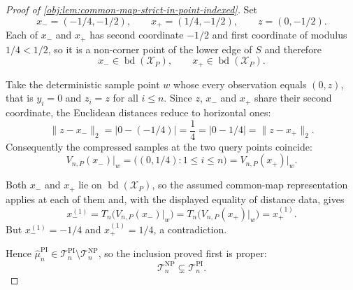 \begin{proof}[Proof of \cref{obj:lem:common-map-strict-in-point-indexed}]
Set
\[
x_-=(-1/4,-1/2),\qquad x_+=(1/4,-1/2),\qquad z=(0,-1/2).
\]
Each of \(x_-\) and \(x_+\) has second coordinate \(-1/2\) and first coordinate of modulus \(1/4<1/2\), so it is a non-corner point of the lower edge of \(S\) and therefore
\[
x_-\in\operatorname{bd}(\mathcal X_P),
\qquad
x_+\in\operatorname{bd}(\mathcal X_P).
\]

Take the deterministic sample point \(w\) whose every observation equals \((0,z)\), that is \(y_i=0\) and \(z_i=z\) for all \(i\leq n\).  Since \(z\), \(x_-\) and \(x_+\) share their second coordinate, the Euclidean distances reduce to horizontal ones:
\[
\lVert z-x_-\rVert_2=\left|0-(-1/4)\right|=\frac14=\left|0-1/4\right|=\lVert z-x_+\rVert_2 .
\]
Consequently the compressed samples at the two query points coincide:
\[
V_{n,P}(x_-)\big|_{w}
=
\bigl((0,1/4):1\leq i\leq n\bigr)
=
V_{n,P}(x_+)\big|_{w}.
\]

Both \(x_-\) and \(x_+\) lie on \(\operatorname{bd}(\mathcal X_P)\), so the assumed common-map representation applies at each of them and, with the displayed equality of distance data, gives
\[
x_-^{(1)}
=
T_n\bigl(V_{n,P}(x_-)\big|_{w}\bigr)
=
T_n\bigl(V_{n,P}(x_+)\big|_{w}\bigr)
=
x_+^{(1)} .
\]
But \(x_-^{(1)}=-1/4\) and \(x_+^{(1)}=1/4\), a contradiction.

Hence \(\widehat\mu_n^{\mathrm{PI}}\in\mathcal T_n^{\mathrm{PI}}\setminus\mathcal T_n^{\mathrm{NP}}\), so the inclusion proved first is proper:
\[
\mathcal T_n^{\mathrm{NP}}\subsetneq\mathcal T_n^{\mathrm{PI}} .
\]
\end{proof}
